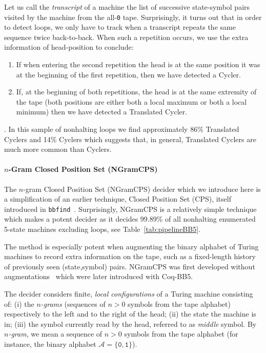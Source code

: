 \documentclass[sigconf,screen]{acmart}
\theoremstyle{definition} %
\numberwithin{equation}{section}
\theoremstyle{definition} %
\newcommand{\szero}{\texttt{0}\xspace}
\newcommand{\sone}{\texttt{1}\xspace}
\newcommand{\cycler}{Cycler\xspace}
\newcommand{\cyclers}{Cyclers\xspace}
\newcommand{\TC}{Translated Cycler\xspace}
\newcommand{\TCs}{Translated Cyclers\xspace}
\newcommand{\headpos}{head-position\xspace}
\newcommand{\alphabet}{\mathcal{A}}
\newcommand{\ssps}{state-symbol pairs\xspace}
\newcommand{\CoqBB}{Coq-BB5\xspace}
\begin{document}
Let us call the \textit{transcript} of a machine the list of successive \ssps visited by the machine from the all-\szero tape. Surprisingly, it turns out that in order to detect loops, we only have to track when a transcript repeats the same sequence twice back-to-back. When such a repetition occurs, we use the extra information of \headpos to conclude:

\begin{enumerate}
    \item If when entering the second repetition the head is at the same position it was at the beginning of the first repetition, then we have detected a \cycler.
    \item If, at the beginning of both repetitions, the head is at the same extremity of the tape (\ie both positions are either both a local maximum or both a local minimum) then we have detected a \TC.
\end{enumerate}

. In this sample of nonhalting loops we find approximately 86\% \TCs and 14\% \cyclers which suggests that, in general, \TCs are much more common than \cyclers.

\paragraph{$n$-Gram Closed Position Set (NGramCPS)} The $n$-gram Closed Position Set (NGramCPS) decider which we introduce here is a simplification of an earlier technique, Closed Position Set (CPS), itself introduced in \texttt{bbfind}~\cite{Skelet_bbfind}. Surprisingly, NGramCPS is a relatively simple technique which makes a potent decider as it decides 99.89\% of all nonhalting enumerated 5-state machines excluding loops, see Table~\ref{tab:pipelineBB5}.

The method is especially potent when augmenting the binary alphabet of Turing machines to record extra information on the tape, such as a fixed-length history of previously seen (state,symbol) pairs. NGramCPS was first developed without augmentations~\cite{ngramcps_fenner} which were later introduced with \CoqBB.

The decider considers finite, \textit{local configurations} of a Turing machine consisting of: (i) the \textit{$n$-grams} (\ie sequences of $n > 0$ symbols from the tape alphabet) respectively to the left and to the right of the head; (ii) the state the machine is in; (iii) the symbol currently read by the head, referred to as \textit{middle} symbol. By \textit{$n$-gram}, we mean a sequence of $n > 0$ symbols from the tape alphabet (for instance, the binary alphabet $\alphabet=\{\szero,\sone\}$).
\end{document}
